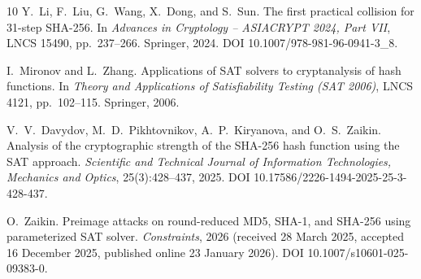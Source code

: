 \documentclass[11pt,a4paper]{article}
\begin{document}
\begin{thebibliography}{10}
Y.~Li, F.~Liu, G.~Wang, X.~Dong, and S.~Sun.
\newblock The first practical collision for 31-step {SHA-256}.
\newblock In \emph{Advances in Cryptology -- ASIACRYPT 2024, Part VII}, LNCS 15490,
  pp.~237--266. Springer, 2024.  DOI 10.1007/978-981-96-0941-3\_8.

I.~Mironov and L.~Zhang.
\newblock Applications of {SAT} solvers to cryptanalysis of hash
  functions.
\newblock In \emph{Theory and Applications of Satisfiability Testing (SAT
  2006)}, LNCS 4121, pp.~102--115. Springer, 2006.

V.~V.~Davydov, M.~D.~Pikhtovnikov, A.~P.~Kiryanova, and O.~S.~Zaikin.
\newblock Analysis of the cryptographic strength of the {SHA-256} hash
  function using the {SAT} approach.
\newblock \emph{Scientific and Technical Journal of Information
  Technologies, Mechanics and Optics}, 25(3):428--437, 2025.
  DOI 10.17586/2226-1494-2025-25-3-428-437.

O.~Zaikin.
\newblock Preimage attacks on round-reduced {MD5}, {SHA-1}, and {SHA-256}
  using parameterized {SAT} solver.
\newblock \emph{Constraints}, 2026 (received 28 March 2025, accepted 16 December
  2025, published online 23 January 2026).  DOI 10.1007/s10601-025-09383-0.

\end{thebibliography}
\end{document}

